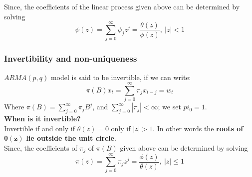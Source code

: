 \documentclass[11pt]{article}
\newcommand{\noi}{\noindent}
\begin{document}
\noi Since, the coefficients of the linear process given above can be determined by solving
$$\psi(z) = \sum_{j=0}^{\infty}{\psi_j z^j} = \frac{\theta(z)}{\phi(z)}, \: |z| <1$$

\subsubsection{Invertibility and non-uniqueness}
$ARMA(p, q)$ model is said to be invertible, if we can write:
$$\pi(B)x_t = \sum_{j=0}^{\infty}\pi_j x_{t-j} = w_t$$
\noi Where $\pi(B) = \sum_{j=0}^{\infty}\pi_j B^j$, and $\sum_{j=0}^{\infty}{|\pi_j|} < \infty$; we set $pi_0 = 1$. \\

\noi \textbf{When is it invertible?} \\
\noi Invertible if and only if $\theta(z) = 0$ only if $|z| > 1$. In other words the \textbf{roots of} $\boldsymbol{\theta(z)}$ \textbf{lie outside the unit circle}. \\

\noi Since, the coefficients of $\pi_j$ of $\pi(B)$ given above can be determined by solving
$$\pi(z) = \sum_{j=0}^{\infty}{\pi_jz^j} = \frac{\phi(z)}{\theta(z)}, \: |z| \leq 1$$
\end{document}
